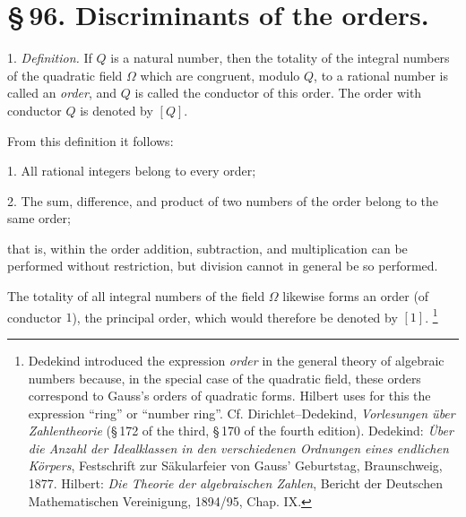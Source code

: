 \documentclass[11pt]{article}
\begin{document}
\section*{\S\,96. Discriminants of the orders.}

1. \emph{Definition.} If $Q$ is a natural number, then the totality of the integral numbers of the quadratic field $\Omega$ which are congruent, modulo $Q$, to a rational number is called an \emph{order}, and $Q$ is called the conductor of this order. The order with conductor $Q$ is denoted by $[Q]$.

From this definition it follows:

1. All rational integers belong to every order;

2. The sum, difference, and product of two numbers of the order belong to the same order;

that is, within the order addition, subtraction, and multiplication can be performed without restriction, but division cannot in general be so performed.

The totality of all integral numbers of the field $\Omega$ likewise forms an order (of conductor $1$), the principal order, which would therefore be denoted by $[1]$.
\footnote{Dedekind introduced the expression \emph{order} in the general theory of algebraic numbers because, in the special case of the quadratic field, these orders correspond to Gauss's orders of quadratic forms. Hilbert uses for this the expression ``ring'' or ``number ring''. Cf. Dirichlet--Dedekind, \emph{Vorlesungen über Zahlentheorie} (\S\,172 of the third, \S\,170 of the fourth edition). Dedekind: \emph{Über die Anzahl der Idealklassen in den verschiedenen Ordnungen eines endlichen Körpers}, Festschrift zur Säkularfeier von Gauss' Geburtstag, Braunschweig, 1877. Hilbert: \emph{Die Theorie der algebraischen Zahlen}, Bericht der Deutschen Mathematischen Vereinigung, 1894/95, Chap. IX.}
\end{document}

